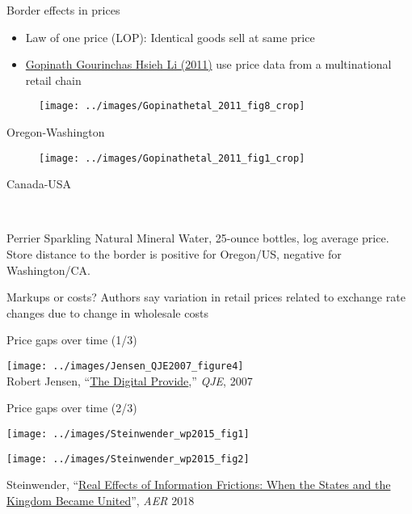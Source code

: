 \documentclass[10pt,notes=hide,aspectratio=169]{beamer}
\begin{document}
\begin{frame}{Border effects in prices}
\begin{itemize}
	\item Law of one price (LOP): Identical goods sell at same price
	\item \href{https://www.aeaweb.org/articles?id=10.1257/aer.101.6.2450}{Gopinath Gourinchas Hsieh Li (2011)} use price data from a multinational retail chain
\end{itemize}
	\begin{minipage}{.45\textwidth} \begin{center}\begin{figure} \texttt{[image: ../images/Gopinathetal\_2011\_fig8\_crop]}\end{figure} Oregon-Washington \end{center} \end{minipage}
	\begin{minipage}{.45\textwidth} \begin{center}\begin{figure} \texttt{[image: ../images/Gopinathetal\_2011\_fig1\_crop]}\end{figure} Canada-USA \end{center} \end{minipage} \\ \vspace{0.1in}
	{\scriptsize Perrier Sparkling Natural Mineral Water, 25-ounce bottles, log average price. Store distance to the border is positive for Oregon/US, negative for Washington/CA. \par }
Markups or costs? Authors say variation in retail prices related to exchange rate changes due to change in wholesale costs
\end{frame}
\begin{frame}{Price gaps over time (1/3)}
\begin{center}\texttt{[image: ../images/Jensen\_QJE2007\_figure4]} \\ \footnotesize{Robert Jensen, ``\href{http://qje.oxfordjournals.org/content/122/3/879.abstract}{The Digital Provide},'' \textit{QJE}, 2007}\end{center}
\end{frame}
\begin{frame}{Price gaps over time (2/3)}
\begin{minipage}{.47\textwidth}\vspace{0pt}\texttt{[image: ../images/Steinwender\_wp2015\_fig1]}\end{minipage}
\begin{minipage}{.47\textwidth}\vspace{0pt}\texttt{[image: ../images/Steinwender\_wp2015\_fig2]}\end{minipage}
\begin{center}\footnotesize{Steinwender, ``\href{https://www.aeaweb.org/articles?id=10.1257/aer.20150681}{Real Effects of Information Frictions: When the States and the Kingdom Became United}'', \textit{AER} 2018} \end{center}
\end{frame}
\end{document}
